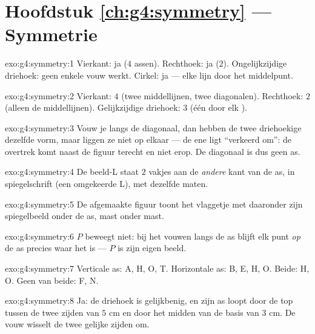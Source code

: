 \section*{Hoofdstuk \ref{ch:g4:symmetry} --- Symmetrie}

\begin{solution}{exo:g4:symmetry:1}
Vierkant: ja ($4$ assen). Rechthoek: ja ($2$). Ongelijkzijdige driehoek:
geen enkele vouw werkt. Cirkel: ja --- elke lijn door het middelpunt.
\end{solution}

\begin{solution}{exo:g4:symmetry:2}
Vierkant: $4$ (twee middellijnen, twee diagonalen). Rechthoek: $2$ (alleen
de middellijnen). Gelijkzijdige driehoek: $3$ (één door elk ).
\end{solution}

\begin{solution}{exo:g4:symmetry:3}
Vouw je langs de diagonaal, dan hebben de twee driehoekige  dezelfde
vorm, maar liggen ze niet op elkaar --- de ene ligt ``verkeerd om'': de
overtrek komt naast de figuur terecht en niet erop. De diagonaal is dus geen
as.
\end{solution}

\begin{solution}{exo:g4:symmetry:4}
De beeld-L staat $2$ vakjes aan de \emph{andere} kant van de as, in
spiegelschrift (een omgekeerde L), met dezelfde maten.
\end{solution}

\begin{solution}{exo:g4:symmetry:5}
De afgemaakte figuur toont het vlaggetje met daaronder zijn spiegelbeeld
onder de as, mast onder mast.
\end{solution}

\begin{solution}{exo:g4:symmetry:6}
$P$ beweegt niet: bij het vouwen langs de as blijft elk punt \emph{op} de as
precies waar het is --- $P$ is zijn eigen beeld.
\end{solution}

\begin{solution}{exo:g4:symmetry:7}
Verticale as: A, H, O, T. Horizontale as: B, E, H, O. Beide: H, O. Geen van
beide: F, N.
\end{solution}

\begin{solution}{exo:g4:symmetry:8}
Ja: de driehoek is gelijkbenig, en zijn as loopt door de top tussen de twee
zijden van $5$ cm en door het midden van de basis van $3$ cm. De vouw wisselt
de twee gelijke zijden om.
\end{solution}

